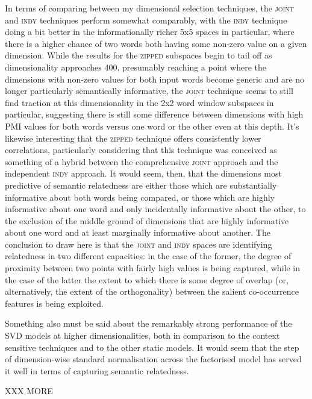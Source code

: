 In terms of comparing between my dimensional selection techniques, the \textsc{joint} and \textsc{indy} techniques perform somewhat comparably, with the \textsc{indy} technique doing a bit better in the informationally richer 5x5 spaces in particular, where there is a higher chance of two words both having some non-zero value on a given dimension.  While the results for the \textsc{zipped} subspaces begin to tail off as dimensionality approaches 400, presumably reaching a point where the dimensions with non-zero values for both input words become generic and are no longer particularly semantically informative, the \textsc{joint} technique seems to still find traction at this dimensionality in the 2x2 word window subspaces in particular, suggesting there is still some difference between dimensions with high PMI values for both words versus one word or the other even at this depth.  It's likewise interesting that the \textsc{zipped} technique offers consistently lower correlations, particularly considering that this technique was conceived as something of a hybrid between the comprehensive \textsc{joint} approach and the independent \textsc{indy} approach.  It would seem, then, that the dimensions most predictive of semantic relatedness are either those which are substantially informative about both words being compared, or those which are highly informative about one word and only incidentally informative about the other, to the exclusion of the middle ground of dimensions that are highly informative about one word and at least marginally informative about another.  The conclusion to draw here is that the \textsc{joint} and \textsc{indy} spaces are identifying relatedness in two different capacities: in the case of the former, the degree of proximity between two points with fairly high values is being captured, while in the case of the latter the extent to which there is some degree of overlap (or, alternatively, the extent of the orthogonality) between the salient co-occurrence features is being exploited.

Something also must be said about the remarkably strong performance of the \textsc{SVD} models at higher dimensionalities, both in comparison to the context sensitive techniques and to the other static models.  It would seem that the step of dimension-wise standard normalisation across the factorised model has served it well in terms of capturing semantic relatedness.

XXX MORE

